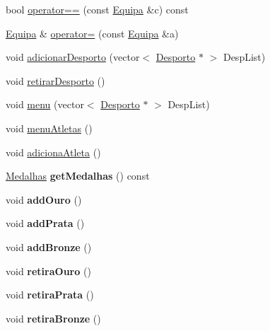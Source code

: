\begin{DoxyCompactItemize}
\item 
bool \hyperlink{class_equipa_a754b42e94c0ca91ac2c2a3890e7f3191}{operator==} (const \hyperlink{class_equipa}{Equipa} \&c) const 
\item 
\hyperlink{class_equipa}{Equipa} \& \hyperlink{class_equipa_a372f3177a2f628ddaff2c40ed7d26bf8}{operator=} (const \hyperlink{class_equipa}{Equipa} \&a)
\item 
void \hyperlink{class_equipa_ac2ab600cc917f8709aeda9a71a0a9aa4}{adicionar\+Desporto} (vector$<$ \hyperlink{class_desporto}{Desporto} $\ast$ $>$ Desp\+List)
\item 
void \hyperlink{class_equipa_a90fac8b1f621a9a82b4b32eb3efcdaa4}{retirar\+Desporto} ()
\item 
void \hyperlink{class_equipa_a44df4366958af97be66020a0f8e18a94}{menu} (vector$<$ \hyperlink{class_desporto}{Desporto} $\ast$ $>$ Desp\+List)
\item 
void \hyperlink{class_equipa_a8f8b5838284e2154abe8608f53ee2681}{menu\+Atletas} ()
\item 
void \hyperlink{class_equipa_afead1fbf9a337c39bb771b37dad578d3}{adiciona\+Atleta} ()
\item 
\hypertarget{class_equipa_a3d430475b8269ca31f0c77f29b2f0118}{}\hyperlink{struct_medalhas}{Medalhas} {\bfseries get\+Medalhas} () const \label{class_equipa_a3d430475b8269ca31f0c77f29b2f0118}

\item 
\hypertarget{class_equipa_a722830d8138c7d63f03e3ed424e536cc}{}void {\bfseries add\+Ouro} ()\label{class_equipa_a722830d8138c7d63f03e3ed424e536cc}

\item 
\hypertarget{class_equipa_a081d994b4fc3ad79aba0b07a12515ef5}{}void {\bfseries add\+Prata} ()\label{class_equipa_a081d994b4fc3ad79aba0b07a12515ef5}

\item 
\hypertarget{class_equipa_a3b4f2e3437724300f7c59b93bad7844e}{}void {\bfseries add\+Bronze} ()\label{class_equipa_a3b4f2e3437724300f7c59b93bad7844e}

\item 
\hypertarget{class_equipa_aa01771d620b565f4ddb793c5a9be2707}{}void {\bfseries retira\+Ouro} ()\label{class_equipa_aa01771d620b565f4ddb793c5a9be2707}

\item 
\hypertarget{class_equipa_ae576595e06f12ff256e20200c3d69083}{}void {\bfseries retira\+Prata} ()\label{class_equipa_ae576595e06f12ff256e20200c3d69083}

\item 
\hypertarget{class_equipa_a6c10562801aba220c52e9db88957a463}{}void {\bfseries retira\+Bronze} ()\label{class_equipa_a6c10562801aba220c52e9db88957a463}

\end{DoxyCompactItemize}
